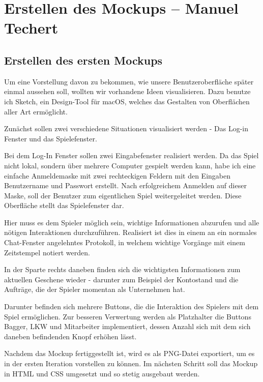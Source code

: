 \chapter{Erstellen des Mockups -- Manuel Techert}

\section{Erstellen des ersten Mockups}

Um eine Vorstellung davon zu bekommen, wie unsere Benutzeroberfläche später einmal aussehen soll, wollten wir vorhandene Ideen visualisieren. Dazu benutze ich Sketch, ein Design-Tool für macOS, welches das Gestalten von Oberflächen aller Art ermöglicht.

Zunächst sollen zwei verschiedene Situationen visualisiert werden - Das Log-in Fenster und das Spielefenster.

Bei dem Log-In Fenster sollen zwei Eingabefenster realisiert werden. Da das Spiel nicht lokal, sondern über mehrere Computer gespielt werden kann, habe ich eine einfache Anmeldemaske mit zwei rechteckigen Feldern mit den Eingaben Benutzername und Passwort erstellt.
Nach erfolgreichem Anmelden auf dieser Maske, soll der Benutzer zum eigentlichen Spiel weitergeleitet werden. Diese Oberfläche stellt das Spielefenster dar.

Hier muss es dem Spieler möglich sein, wichtige Informationen abzurufen und alle nötigen Interaktionen durchzuführen. Realisiert ist dies in einem an ein normales Chat-Fenster angelehntes Protokoll, in welchem wichtige Vorgänge mit einem Zeitstempel notiert werden.

In der Sparte rechts daneben finden sich die wichtigsten Informationen zum aktuellen Geschene wieder - darunter zum Beispiel der Kontostand und die Aufträge, die der Spieler momentan als Unternehmen hat.

Darunter befinden sich mehrere Buttons, die die Interaktion des Spielers mit dem Spiel ermöglichen. Zur besseren Verwertung werden als Platzhalter die Buttons Bagger, LKW und Mitarbeiter implementiert, dessen Anzahl sich mit dem sich daneben befindenden Knopf erhöhen lässt.

Nachdem das Mockup fertiggestellt ist, wird es als PNG-Datei exportiert, um es in der ersten Iteration vorstellen zu können.
Im nächsten Schritt soll das Mockup in HTML und CSS umgesetzt und so stetig ausgebaut werden.


